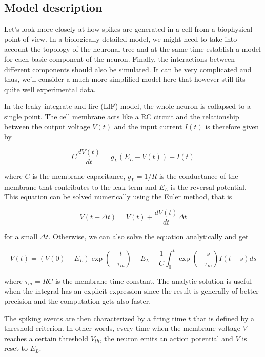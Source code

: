 \subsection{Model description}

Let's look more closely at how spikes are generated in a cell from a 
biophysical point of view. In a biologically detailed model, we might need 
to take into account the topology of the neuronal tree and at the same time
establish a model for each basic component of the neuron. Finally, the 
interactions between different components should also be simulated. 
It can be very complicated and thus, we'll consider a much more 
simplified model here that however still fits quite well experimental data.

In the leaky integrate-and-fire (LIF) model, the whole neuron is collapsed to
a single point. The cell membrane acts like a RC circuit and the relationship
between the output voltage $V(t)$ and the input current $I(t)$ is therefore
given by

\begin{equation}
  \label{eq: LIF}
  C\frac{dV(t)}{dt} = g_L(E_L - V(t)) + I(t)
\end{equation}

\noindent
where $C$ is the membrane capacitance, $g_L = 1/R$ is the conductance of the
membrane that contributes to the leak term and $E_L$ is the reversal
potential. 
This equation can be solved numerically using the Euler method, that is 

\begin{equation}
  V(t + \Delta t) = V(t) + \frac{dV(t)}{dt}\Delta t
\end{equation}

\noindent
for a small $\Delta t$. Otherwise, we can also solve the equation analytically
and get

\begin{equation}
  \label{eq: LIF_sol}
  V(t) = (V(0)-E_L)\exp(-\frac{t}{\tau_m}) + E_L + \frac{1}{C}
  \int_0^t\exp(-\frac{s}{\tau_m})I(t-s)ds
\end{equation}

\noindent
where $\tau_m = RC$ is the membrane time constant. The analytic solution is
useful when the integral has an explicit expression since the result is
generally of better precision and the computation gets also faster.

The spiking events are then characterized by a firing time $t$ that is defined
by a threshold criterion. In other words, every time when the membrane voltage
$V$ reaches a certain threshold $V_{th}$, the neuron emits an action potential
and $V$ is reset to $E_L$.

